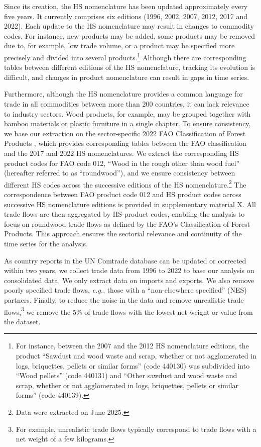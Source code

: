 \documentclass[
  authoryear,
  review,
  3p]{elsarticle}
\begin{document}
Since its creation, the HS nomenclature has been updated approximately
every five years. It currently comprises six editions (1996, 2002, 2007,
2012, 2017 and 2022). Each update to the HS nomenclature may result in
changes to commodity codes. For instance, new products may be added,
some products may be removed due to, for example, low trade volume, or a
product may be specified more precisely and divided into several
products.\footnote{For instance, between the 2007 and the 2012 HS
  nomenclature editions, the product ``Sawdust and wood waste and scrap,
  whether or not agglomerated in logs, briquettes, pellets or similar
  forms'' (code 440130) was subdivided into ``Wood pellets'' (code
  440131) and ``Other sawdust and wood waste and scrap, whether or not
  agglomerated in logs, briquettes, pellets or similar forms'' (code
  440139).} Although there are corresponding tables between different
editions of the HS nomenclature, tracking its evolution is difficult,
and changes in product nomenclature can result in gaps in time series.

Furthermore, although the HS nomenclature provides a common language for
trade in all commodities between more than 200 countries, it can lack
relevance to industry sectors. Wood products, for example, may be
grouped together with bamboo materials or plastic furniture in a single
chapter. To ensure consistency, we base our extraction on the
sector-specific 2022 FAO Classification of Forest Products
\citep{2022FAOclassif}, which provides corresponding tables between the
FAO classification and the 2017 and 2022 HS nomenclatures. We extract
the corresponding HS product codes for FAO code 012, ``Wood in the rough
other than wood fuel'' (hereafter referred to as ``roundwood''), and we
ensure consistency between different HS codes across the successive
editions of the HS nomenclature.\footnote{Data were extracted on June
  2025.} The correspondence between FAO product code 012 and HS product
codes across successive HS nomenclature editions is provided in
supplementary material X. All trade flows are then aggregated by HS
product codes, enabling the analysis to focus on roundwood trade flows
as defined by the FAO's Classification of Forest Products. This approach
ensures the sectorial relevance and continuity of the time series for
the analysis.

As country reports in the UN Comtrade database can be updated or
corrected within two years, we collect trade data from 1996 to 2022 to
base our analysis on consolidated data. We only extract data on imports
and exports. We also remove poorly specified trade flows, \emph{e.g.},
those with a ``non-elsewhere specified'' (NES) partners. Finally, to
reduce the noise in the data and remove unrealistic trade
flows,\footnote{For example, unrealistic trade flows typically
  correspond to trade flows with a net weight of a few kilograms.} we
remove the 5\% of trade flows with the lowest net weight or value from
the dataset.
\end{document}
